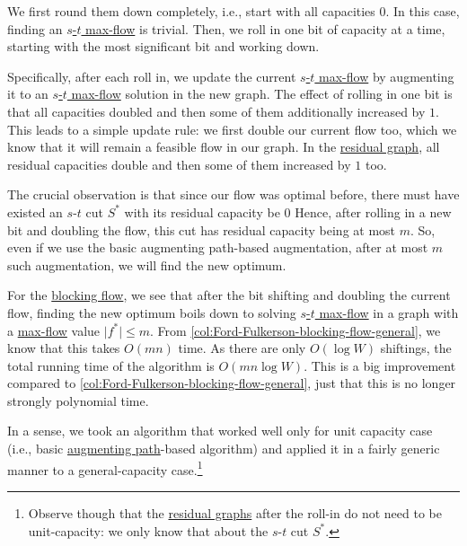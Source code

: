 We first round them down completely, i.e., start with all capacities \(0\). In this case, finding an \hyperref[prb:s-t-max-flow]{\(s\)-\(t\) max-flow} is trivial. Then, we roll in one bit of capacity at a time, starting with the most significant bit and working down.

Specifically, after each roll in, we update the current \hyperref[prb:s-t-max-flow]{\(s\)-\(t\) max-flow} by augmenting it to an \hyperref[prb:s-t-max-flow]{\(s\)-\(t\) max-flow} solution in the new graph. The effect of rolling in one bit is that all capacities doubled and then some of them additionally increased by \(1\). This leads to a simple update rule: we first double our current flow too, which we know that it will remain a feasible flow in our graph. In the \hyperref[def:residual-graph]{residual graph}, all residual capacities double and then some of them increased by \(1\) too.

The crucial observation is that since our flow was optimal before, there must have existed an \(s\)-\(t\) cut \(S^{\ast} \) with its residual capacity be \(0\) Hence, after rolling in a new bit and doubling the flow, this cut has residual capacity being at most \(m\). So, even if we use the basic augmenting path-based augmentation, after at most \(m\) such augmentation, we will find the new optimum.

For the \hyperref[def:blocking-flow]{blocking flow}, we see that after the bit shifting and doubling the current flow, finding the new optimum boils down to solving \hyperref[prb:s-t-max-flow]{\(s\)-\(t\) max-flow} in a graph with a \hyperref[prb:s-t-max-flow]{max-flow} value \(\lvert f^{\ast} \rvert \leq m\). From \autoref{col:Ford-Fulkerson-blocking-flow-general}, we know that this takes \(O(mn)\) time. As there are only \(O(\log W)\) shiftings, the total running time of the algorithm is \(O(mn \log W)\). This is a big improvement compared to \autoref{col:Ford-Fulkerson-blocking-flow-general}, just that this is no longer strongly polynomial time.

\begin{note}
	In a sense, we took an algorithm that worked well only for unit capacity case (i.e., basic \hyperref[def:augmenting-path]{augmenting path}-based algorithm) and applied it in a fairly generic manner to a general-capacity case.\footnote{Observe though that the \hyperref[def:residual-graph]{residual graphs} after the roll-in do not need to be unit-capacity: we only know that about the \(s\)-\(t\) cut \(S^{\ast} \).}
\end{note}

